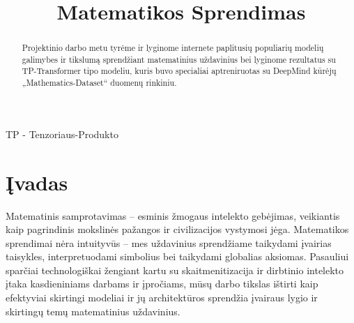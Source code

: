 \documentclass[conference]{IEEEtran}
\begin{document}
\title{Matematikos Sprendimas}

\author{
\and
{}
\and
{}
}

\maketitle

\begin{abstract}
Projektinio darbo metu tyrėme ir lyginome internete paplitusių populiarių modelių
galimybes ir tikslumą sprendžiant matematinius uždavinius bei lyginome rezultatus su
TP-Transformer \cite{tptransformer} tipo modeliu, kuris buvo specialiai aptreniruotas su DeepMind kūrėjų
„Mathematics-Dataset“ duomenų rinkiniu.
\end{abstract}

\begin{IEEEkeywords}
TP - Tenzoriaus-Produkto
\end{IEEEkeywords}


\section{Įvadas}
Matematinis samprotavimas – esminis žmogaus intelekto gebėjimas, veikiantis kaip pagrindinis mokslinės pažangos ir civilizacijos vystymosi jėga. Matematikos sprendimai nėra intuityvūs – mes uždavinius sprendžiame taikydami įvairias taisykles, interpretuodami simbolius bei taikydami globalias aksiomas. Pasauliui sparčiai technologiškai žengiant kartu su skaitmenitizacija ir dirbtinio intelekto įtaka kasdieniniams darbams ir įpročiams, mūsų darbo tikslas ištirti kaip efektyviai skirtingi modeliai ir jų architektūros sprendžia įvairaus lygio ir skirtingų temų matematinius uždavinius.
\end{document}

